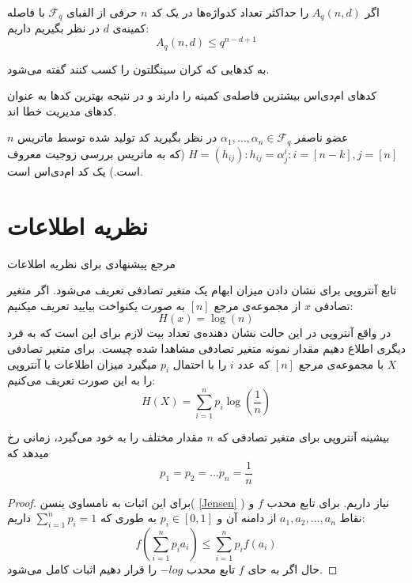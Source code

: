 \begin{definition}
	اگر
	$A_q(n, d)$
	را حداکثر تعداد کدواژه‌ها در یک کد
	$n$
	حرفی از الفبای
	$\mathcal{F}_q$
	با فاصله کمینه‌ی 
	$d$
	در نظر بگیریم داریم:
	\begin{equation}
		A_q(n, d) \leq q^{n - d + 1}
	\end{equation}
	\cite{wiki:Singleton}
\end{definition}
\begin{definition}
	\label{def:mds}
	به کدهایی که کران سینگلتون را کسب کنند گفته می‌شود.
\end{definition}

کدهای ام‌دی‌اس بیشترین فاصله‌ی کمینه را دارند و در نتیجه بهترین کدها به عنوان کدهای مدیریت خطا اند.
\begin{example}
	$n$
	عضو ناصفر
	$\alpha_1, \ldots, \alpha_n \in \mathcal{F}_q$
	در نظر بگیرید کد تولید شده توسط ماتریس 
	$H = (h_{ij}): h_{ij} = \alpha_j^i: i = [n - k], j = [n]$
	(که به ماتریس  بررسی زوجیت معروف است.)	یک کد ام‌دی‌اس است.
\end{example}
\section{
    ‌نظریه اطلاعات
}
مرجع پیشنهادی برای نظریه اطلاعات
\cite{book:info}

تابع آنتروپی برای نشان دادن میزان ابهام یک متغیر تصادفی تعریف می‌شود. اگر متغیر تصادفی
$x$
از مجموعه‌ی مرجع
$[n]$
به صورت یکنواخت بیایید تعریف میکنیم:
$$H(x) = \log(n)$$
در واقع آنتروپی در این حالت نشان دهنده‌ی تعداد بیت لازم برای این است که به فرد دیگری اطلاع دهیم مقدار نمونه متغیر تصادفی مشاهدا شده چیست. برای متغیر تصادفی
$X$
با مجموعه‌ی مرجع
$[n]$
که عدد
$i$
را با احتمال
$p_i$
میگیرد میزان اطلاعات یا آنتروپی را به این صورت تعریف می‌کنیم:
$$H(X) = \sum_{i = 1}^{n} p_i \log(\frac{1}{n})$$

\begin{theorem}
بیشینه آنتروپی برای متغیر تصادفی که
$n$
مقدار مختلف را به خود می‌گیرد، زمانی رخ میدهد که
$$p_1 = p_2 = \dots p_n = \frac{1}{n}$$
\end{theorem}
\begin{proof}
برای این اثبات به نامساوی ینسن(
\autoref{Jensen}
)
 نیاز داریم. برای تابع محدب
$f$
و نقاط
$a_1, a_2, \dots, a_n$
از دامنه آن و
$p_i \in [0, 1]$
به طوری که
$\sum_{i = 1}^{n} p_i = 1$
داریم:
$$f(\sum_{i = 1}^{n} p_i a_i) \leq \sum_{i = 1}^{n} p_i f(a_i)$$
حال اگر به حای
$f$
تابع محدب
$- log$
را قرار دهیم اثبات کامل می‌شود.
\end{proof}

